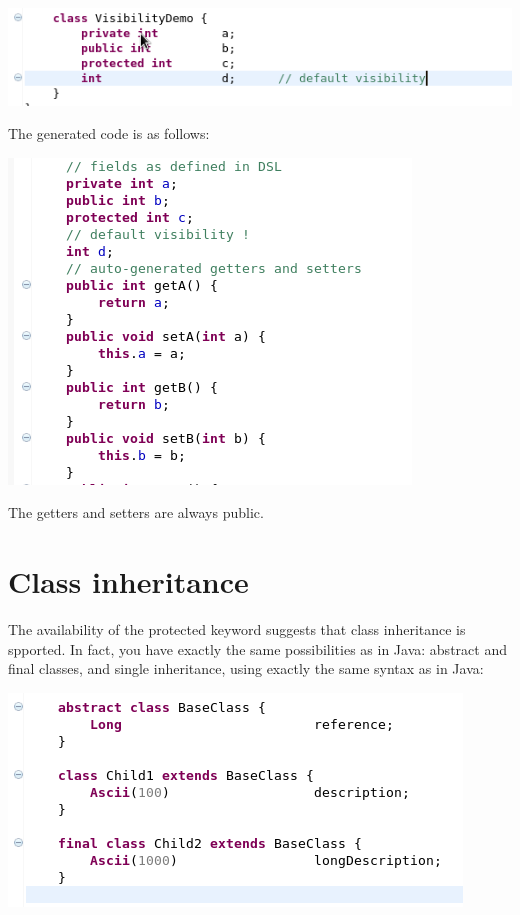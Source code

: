 \documentclass[11pt,a4paper,oneside]{article}
\begin{document}
\vspace{2mm}
\hspace{1cm}\includegraphics[scale=0.5]{images/tut1-006.png}
 
\noindent The generated code is as follows:

\vspace{2mm}
\hspace{1cm}\includegraphics[scale=0.5]{images/tut1-008.png}
 
\noindent The getters and setters are always public.

\section{Class inheritance}
The availability of the {\ttfamily protected} keyword suggests that class inheritance is spported. In fact, you have exactly the same
possibilities as in Java: abstract and final classes, and single inheritance, using exactly the same syntax as in Java:
 

\vspace{2mm}
\hspace{1cm}\includegraphics[scale=0.5]{images/tut1-007.png}
\end{document}

